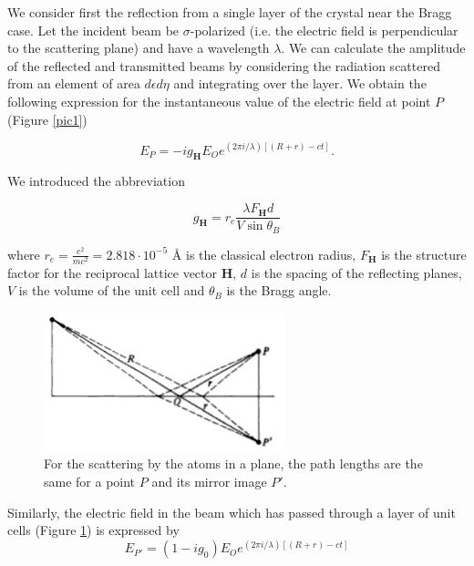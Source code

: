 \documentclass[12pt,oneside,notitlepage,abstracton,a4paper]{scrartcl}
\begin{document}
We consider first the reflection from a single layer of the crystal near the Bragg case. Let the incident beam be $\sigma$-polarized (i.e. the electric field is perpendicular to the scattering plane) and have a wavelength $\lambda$. We can calculate the amplitude of the reflected and transmitted beams by considering the radiation scattered from an element of area $d\epsilon d\eta$ and integrating over the layer. We obtain the following expression for the instantaneous value of the electric field at point $P$ (Figure \ref{pic1})

\begin{equation}
 E_P=-ig_\mathbf{H}E_Oe^{(2\pi i /\lambda)[(R+r)-ct]}.
\end{equation}

We introduced the abbreviation

\begin{equation}\label{eqg}
 g_\mathbf{H}=r_e\frac{\lambda F_\mathbf{H}d}{V \sin{\theta_B}}
\end{equation}

where $r_e=\frac{e^2}{mc^2}=2.818 \cdot 10^{-5}$ \AA{} is the classical electron radius, $F_\mathbf{H}$ is the structure factor for the reciprocal lattice vector $\mathbf{H}$, $d$ is the spacing of the reflecting planes, $V$ is the volume of the unit cell and $\theta_B$ is the Bragg angle.

\begin{figure}[h]
\begin{center}
\includegraphics[width=7cm]{pics/picture2.png}
\vspace{-10pt}
\caption{For the scattering by the atoms in a plane, the path lengths are the same for a point $P$ and its mirror image $P'$.}
\label{pic2}
\vspace{-10pt}
\end{center}
\end{figure}


Similarly, the electric field in the beam which has passed through a layer of unit cells (Figure \ref{pic2}) is expressed by
\begin{equation}\label{Et}
 E_{P'}=(1-ig_0)E_Oe^{(2\pi i /\lambda)[(R+r)-ct]}
\end{equation}
\end{document}
